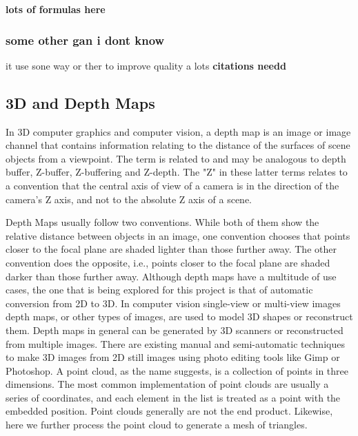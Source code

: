 \documentclass{article}
\begin{document}
\textbf{lots of formulas here}

\subsubsection{some other gan i dont know}
it use sone way or ther to improve quality a lots \textbf{citations needd}

\subsection{3D and Depth Maps}

In 3D computer graphics and computer vision, a depth map is an image or image channel that contains information relating to the distance of the surfaces of scene objects from a viewpoint. The term is related to and may be analogous to depth buffer, Z-buffer, Z-buffering and Z-depth. The "Z" in these latter terms relates to a convention that the central axis of view of a camera is in the direction of the camera's Z axis, and not to the absolute Z axis of a scene.

Depth Maps usually follow two conventions. While both of them show the relative distance between objects in an image, one convention chooses that points closer to the focal plane are shaded lighter than those further away. The other convention does the opposite, i.e., points closer to the focal plane are shaded darker than those further away.
Although depth maps have a multitude of use cases, the one that is being explored for this project is that of automatic conversion from 2D to 3D. In computer vision single-view or multi-view images depth maps, or other types of images, are used to model 3D shapes or reconstruct them. Depth maps in general can be generated by 3D scanners or reconstructed from multiple images.
There are existing manual and semi-automatic techniques to make 3D images from 2D still images using photo editing tools like Gimp or Photoshop.
A point cloud, as the name suggests, is a collection of points in three dimensions. The most common implementation of point clouds are usually a series of coordinates, and each element in the list is treated as a point with the embedded position. Point clouds generally are not the end product. Likewise, here we further process the point cloud to generate a mesh of triangles.
\end{document}
